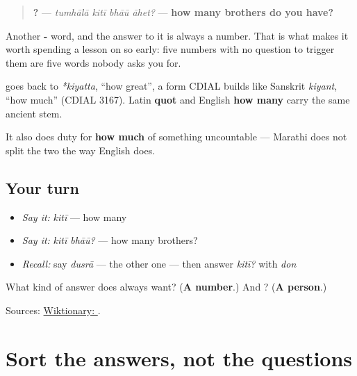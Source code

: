 \begin{quote}
\textbf{   ?} — \emph{tumhālā kitī bhāū āhet?} — \textbf{how many brothers do you have?}
\end{quote}

Another \textbf{-} word, and the answer to it is always a number. That is what makes it worth spending a lesson on so early: five numbers with no question to trigger them are five words nobody asks you for.

\textbf{} goes back to \emph{*kiyatta}, \textquotedblleft{}how great\textquotedblright{}, a form CDIAL builds like Sanskrit \emph{kiyant}, \textquotedblleft{}how much\textquotedblright{} (CDIAL 3167). Latin \textbf{quot} and English \textbf{how many} carry the same ancient stem.

It also does duty for \textbf{how much} of something uncountable — Marathi does not split the two the way English does.

\subsection*{Your turn}
\begin{itemize}
\raggedright
  \item \emph{Say it:} \emph{kitī} — how many
  \item \emph{Say it:} \emph{kitī bhāū?} — how many brothers?
  \item \emph{Recall:} say \emph{dusrā} — the other one — then answer \emph{kitī?} with \emph{don}
\end{itemize}

\begin{tcolorbox}[breakable,colback=teal!4,colframe=teal!35!black,title={Before you move on}]
What kind of answer does \textbf{} always want? (\textbf{A number}.) And \textbf{}? (\textbf{A person}.)

Sources: \href{https://en.wiktionary.org/wiki/\%E0\%A4\%95\%E0\%A4\%BF\%E0\%A4\%A4\%E0\%A5\%80}{Wiktionary: }.
\end{tcolorbox}
\section[\texorpdfstring{\mr{कोण}? · \mr{किती}? (koṇ? · kitī?)}{कोण? · किती? (koṇ? · kitī?)}]{Sort the answers, not the questions}

\label{lesson:MR-R37-who-how-many}



